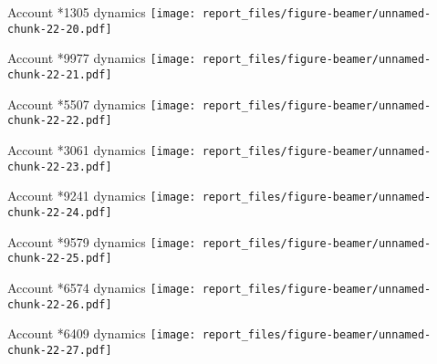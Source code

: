 \documentclass[ignorenonframetext,]{beamer}
\begin{document}
\begin{frame}{Account *1305 dynamics
\texttt{[image: report\_files/figure-beamer/unnamed-chunk-22-20.pdf]}}
\protect\hypertarget{account-1305-dynamics-1}{}

\end{frame}

\begin{frame}{Account *9977 dynamics
\texttt{[image: report\_files/figure-beamer/unnamed-chunk-22-21.pdf]}}
\protect\hypertarget{account-9977-dynamics}{}

\end{frame}

\begin{frame}{Account *5507 dynamics
\texttt{[image: report\_files/figure-beamer/unnamed-chunk-22-22.pdf]}}
\protect\hypertarget{account-5507-dynamics-1}{}

\end{frame}

\begin{frame}{Account *3061 dynamics
\texttt{[image: report\_files/figure-beamer/unnamed-chunk-22-23.pdf]}}
\protect\hypertarget{account-3061-dynamics-1}{}

\end{frame}

\begin{frame}{Account *9241 dynamics
\texttt{[image: report\_files/figure-beamer/unnamed-chunk-22-24.pdf]}}
\protect\hypertarget{account-9241-dynamics-1}{}

\end{frame}

\begin{frame}{Account *9579 dynamics
\texttt{[image: report\_files/figure-beamer/unnamed-chunk-22-25.pdf]}}
\protect\hypertarget{account-9579-dynamics-1}{}

\end{frame}

\begin{frame}{Account *6574 dynamics
\texttt{[image: report\_files/figure-beamer/unnamed-chunk-22-26.pdf]}}
\protect\hypertarget{account-6574-dynamics}{}

\end{frame}

\begin{frame}{Account *6409 dynamics
\texttt{[image: report\_files/figure-beamer/unnamed-chunk-22-27.pdf]}}
\protect\hypertarget{account-6409-dynamics-1}{}

\end{frame}
\end{document}
